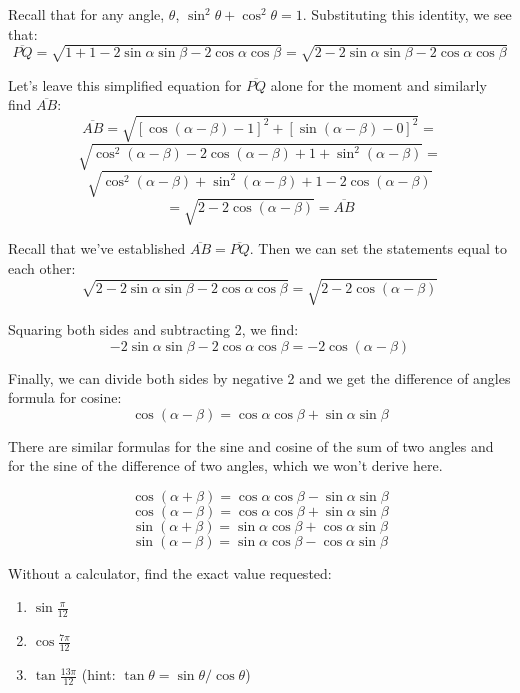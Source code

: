 Recall that for any angle, $\theta$, $\sin^2{\theta} + \cos^2{\theta} = 1$. 
Substituting this identity, we see that:
$$\overline{PQ} = \sqrt{1 + 1 -2\sin{\alpha}\sin{\beta} - 2\cos{\alpha}\cos{
\beta}} = \sqrt{2 - 2\sin{\alpha}\sin{\beta} - 2\cos{\alpha}\cos{\beta}}$$

Let's leave this simplified equation for $\overline{PQ}$ alone for the moment 
and similarly find $\overline{AB}$:
$$\overline{AB} = \sqrt{\left[ \cos{\left( \alpha - \beta \right)} - 1 \right]^
2 + \left[ \sin{\left( \alpha - \beta \right)} - 0 \right]^2} = $$
$$\sqrt{\cos^2{ \left( \alpha - \beta \right)} - 2\cos{ \left( \alpha - \beta 
\right)} + 1 + \sin^2{ \left( \alpha - \beta \right)}} = $$
$$\sqrt{\cos^2{ \left( \alpha - \beta \right)} + \sin^2{ \left( \alpha - \beta 
\right)} + 1 - 2\cos{ \left( \alpha - \beta \right)}} $$
$$= \sqrt{2 - 2\cos{ \left( \alpha - \beta \right)}} = \overline{AB}$$

Recall that we've established $\overline{AB} = \overline{PQ}$. Then we can set 
the statements equal to each other:
$$ \sqrt{2 - 2\sin{\alpha}\sin{\beta} - 2\cos{\alpha}\cos{\beta}} = \sqrt{2 - 2
\cos{ \left( \alpha - \beta \right)}}$$

Squaring both sides and subtracting 2, we find:
$$-2\sin{\alpha}\sin{\beta} - 2\cos{\alpha}\cos{\beta} = -2\cos{\left( \alpha -
\beta \right)}$$

Finally, we can divide both sides by negative 2 and we get the difference of 
angles formula for cosine:
$$\cos{ \left( \alpha - \beta \right)} = \cos{\alpha}\cos{\beta} + \sin{\alpha}
\sin{\beta}$$

There are similar formulas for the sine and cosine of the sum of two angles and
for the sine of the difference of two angles, which we won't derive here. 

\begin{mdframed}[style=important, frametitle={Sum and Difference Formulas}]
$$\cos{ \left( \alpha + \beta \right)} = \cos{\alpha}\cos{\beta} - \sin{\alpha}
\sin{\beta}$$
$$\cos{ \left( \alpha - \beta \right)} = \cos{\alpha}\cos{\beta} + \sin{\alpha}
\sin{\beta}$$
$$\sin{ \left( \alpha + \beta \right)} = \sin{\alpha}\cos{\beta} + \cos{\alpha}
\sin{\beta}$$
$$\sin{ \left( \alpha - \beta \right)} = \sin{\alpha}\cos{\beta} - \cos{\alpha}
\sin{\beta}$$
\end{mdframed}

\begin{Exercise}[label = sum_diff]
Without a calculator, find the exact value requested:
\begin{enumerate}
\item $\sin{\frac{\pi}{12}}$
\item $\cos{\frac{7\pi}{12}}$
\item $\tan{\frac{13\pi}{12}}$ (hint: $\tan{\theta} = \sin{\theta}/\cos{\theta}
$)
\end{enumerate}
\end{Exercise}


